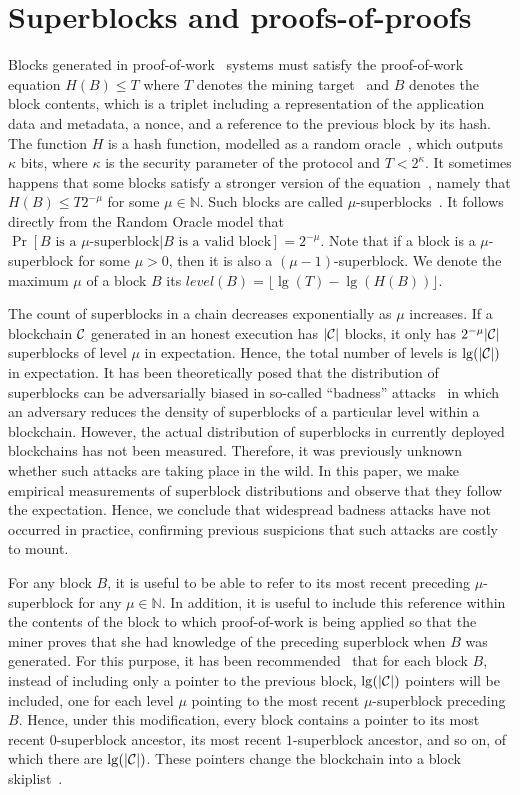 \section{Superblocks and proofs-of-proofs}

Blocks generated in proof-of-work~\cite{C:DwoNao92} systems must satisfy the
proof-of-work equation $H(B) \leq T$ where $T$ denotes the mining
target~\cite{SP:BMCNKF15} and $B$ denotes the block contents, which is a triplet
including a representation of the application data and metadata, a nonce, and a
reference to the previous block by its hash. The function $H$ is a hash
function, modelled as a random oracle~\cite{CCS:BelRog93}, which outputs
$\kappa$ bits, where $\kappa$ is the security parameter of the protocol and $T <
2^\kappa$. It sometimes happens that some blocks satisfy a stronger version of
the equation~\cite{popow}, namely that $H(B) \leq T2^{-\mu}$ for some $\mu \in
\mathbb{N}$. Such blocks are called $\mu$-superblocks~\cite{nipopows}.
It follows directly from the Random Oracle model that
$\Pr[B \text{ is a } \mu\text{-superblock}|B \text{ is a valid block}] = 2^{-\mu}$. Note that if a block is a $\mu$-superblock for some $\mu > 0$, then it is
also a $(\mu - 1)$-superblock. We denote the maximum $\mu$ of a block $B$ its
$level(B) = \lfloor \lg(T) - \lg(H(B)) \rfloor$.

The count of superblocks in a chain decreases exponentially as $\mu$ increases.
If a blockchain $\mathcal{C}$ generated in an honest execution has $|\mathcal{C}|$ blocks,
it only has $2^{-\mu}|\mathcal{C}|$ superblocks of level $\mu$ in expectation. Hence,
the total number of levels is $\lg(|\mathcal{C}|)$ in expectation. It has been
theoretically posed that the distribution of superblocks can be adversarially
biased in so-called ``badness'' attacks~\cite{nipopows} in which an adversary
reduces the density of superblocks of a particular level within a blockchain.
However, the actual distribution of superblocks in currently deployed
blockchains has not been measured. Therefore, it was previously unknown whether
such attacks are taking place in the wild. In this paper, we make empirical
measurements of superblock distributions and observe that they follow the
expectation. Hence, we conclude that widespread badness attacks have not
occurred in practice, confirming previous suspicions that such attacks are
costly to mount.

For any block $B$,
it is useful to be able to refer to its most recent preceding $\mu$-superblock
for any $\mu \in \mathbb{N}$. In addition, it is useful to include this
reference within the contents of the block to which proof-of-work is being applied
so that the miner proves that she had knowledge of the preceding superblock
when $B$ was generated. For this purpose, it has been
recommended~\cite{nipopows} that for each block $B$, instead of including only a
pointer to the previous block, $\lg(|\mathcal{C}|)$ pointers will be included, one
for each level $\mu$ pointing to the most recent $\mu$-superblock preceding $B$.
Hence, under this modification, every block contains a pointer to its most
recent $0$-superblock ancestor, its most recent $1$-superblock ancestor, and so
on, of which there are $\lg(|\mathcal{C}|)$. These pointers change the blockchain
into a block skiplist~\cite{skiplist,papadakis1993skip}.

